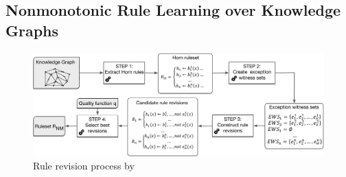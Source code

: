 


\subsection{Nonmonotonic Rule Learning over Knowledge Graphs}
\begin{figure}[t]
\centering
\includegraphics[width=\textwidth]{figures/overview}
\caption{Rule revision process by~\cite{gad2016,rumis}}
\label{fig:iswc_process}
\end{figure}

